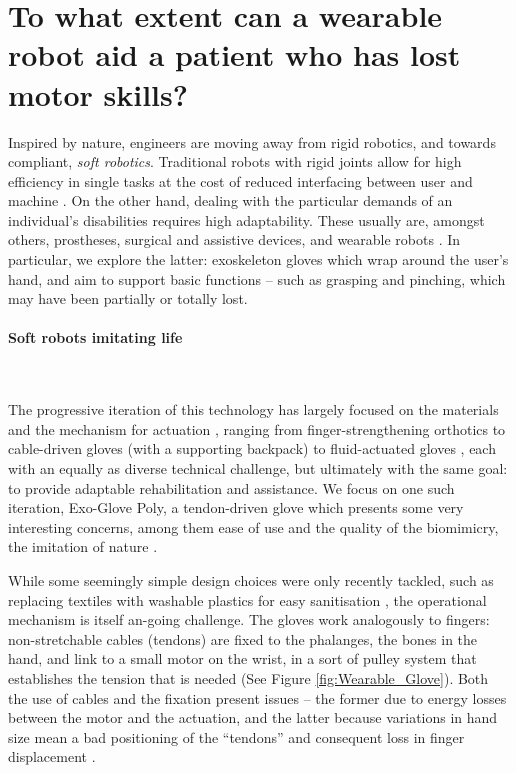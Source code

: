 \section*{To what extent can a wearable robot aid a patient who has lost motor skills?}

Inspired by nature, engineers are moving away from rigid robotics, and towards compliant, \textit{soft robotics}.
Traditional robots with rigid joints allow for high efficiency in single tasks at the cost of reduced interfacing between user and machine \citep{DanielaRus2015Dfac}.
On the other hand, dealing with the particular demands of an individual's disabilities requires high adaptability. These usually are, amongst others, prostheses, surgical and assistive devices, and wearable robots \citep{CianchettiMatteo2018Baos}.
In particular, we explore the latter: exoskeleton gloves which wrap around the user's hand, and aim to support basic functions -- such as grasping and pinching, which may have been partially or totally lost.

\paragraph{Soft robots imitating life}
\

The progressive iteration of this technology has largely focused on the materials and the mechanism for actuation \citep{ShahidTalha2018MtSR,YeoJooChuan2016SRFS}, ranging from finger-strengthening orthotics to cable-driven gloves (with a supporting backpack) to fluid-actuated gloves \citep{CianchettiMatteo2018Baos,DelphMichaelA2013Asre}, each with an equally as diverse technical challenge, but ultimately with the same goal: to provide adaptable rehabilitation and assistance.
We focus on one such iteration, Exo-Glove Poly, a tendon-driven glove which presents some very interesting concerns, among them ease of use and the quality of the biomimicry, the imitation of nature \citep{KangB.B2012Ftij}.

While some seemingly simple design choices were only recently tackled, such as replacing textiles with washable plastics for easy sanitisation \citep{KangB.B2016IIC}, the operational mechanism is itself an-going challenge.
The gloves work analogously to fingers: non-stretchable cables (tendons) are fixed to the phalanges, the bones in the hand, and link to a small motor on the wrist, in a sort of pulley system that establishes the tension that is needed (See Figure \ref{fig:Wearable_Glove}).
Both the use of cables and the fixation present issues -- the former due to energy losses between the motor and the actuation, and the latter because variations in hand size mean a bad positioning of the ``tendons'' and consequent loss in finger displacement \citep{CianchettiMatteo2018Baos,InHyunki2011Jsau,KangB.B2012Ftij}.

